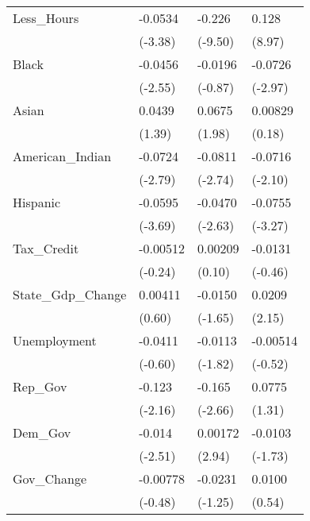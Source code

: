 \begin{longtable}{p{3 cm} p{2.25 cm} p{2.25 cm} p{2.25 cm}}
Less\_Hours  &     -0.0534\sym{***}&      -0.226\sym{***}&       0.128\sym{***}\\
            &     (-3.38)         &     (-9.50)         &      (8.97)         \\
Black      &     -0.0456\sym{*}  &     -0.0196         &     -0.0726\sym{**} \\
            &     (-2.55)         &     (-0.87)         &     (-2.97)         \\
Asian      &      0.0439         &      0.0675\sym{*}  &     0.00829         \\
            &      (1.39)         &      (1.98)         &      (0.18)         \\
American\_Indian      &     -0.0724\sym{**} &     -0.0811\sym{**} &     -0.0716\sym{*}  \\
            &     (-2.79)         &     (-2.74)         &     (-2.10)         \\
Hispanic        &     -0.0595\sym{***}&     -0.0470\sym{**} &     -0.0755\sym{**} \\
            &     (-3.69)         &     (-2.63)         &     (-3.27)         \\
Tax\_Credit  &    -0.00512         &     0.00209\sym{*}        &     -0.0131         \\
            &     (-0.24)         &      (0.10)         &     (-0.46)         \\
State\_Gdp\_Change&     0.00411         &     -0.0150         &      0.0209\sym{*}  \\
            &      (0.60)         &     (-1.65)         &      (2.15)         \\
Unemployment &     -0.0411         &     -0.0113\sym{*}        &      -0.00514\sym{*}  \\
            &      (-0.60)         &     (-1.82)         &      (-0.52)         \\            
Rep\_Gov     &      -0.123\sym{*}  &      -0.165\sym{**} &     0.0775         \\
            &     (-2.16)         &     (-2.66)         &     (1.31)         \\
Dem\_Gov     &      -0.014\sym{*}  &      0.00172\sym{**} &      -0.0103         \\
            &     (-2.51)         &     (2.94)         &     (-1.73)         \\
Gov\_Change  &    -0.00778         &     -0.0231         &      0.0100         \\
            &     (-0.48)         &     (-1.25)         &      (0.54)         \\

\end{longtable}
